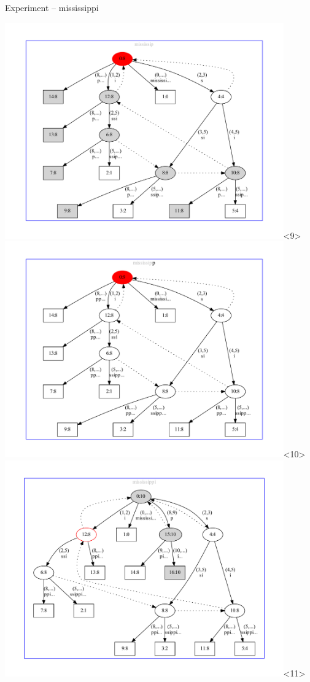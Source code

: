 \begin{frame}[shrink=13]{Experiment -- mississippi}
\begin{overlayarea}{\textwidth}{\textheight}
\includegraphics[keepaspectratio,trim=40pt 40pt 40pt 40pt,height=0.8\textheight,width=0.9\textwidth]{mississip.pdf}<9>
\includegraphics[keepaspectratio,trim=40pt 40pt 40pt 40pt,height=0.8\textheight,width=0.9\textwidth]{mississipp.pdf}<10>
\includegraphics[keepaspectratio,trim=40pt 40pt 40pt 40pt,height=0.8\textheight,width=0.9\textwidth]{mississippi.pdf}<11>

\end{overlayarea}
\end{frame}
